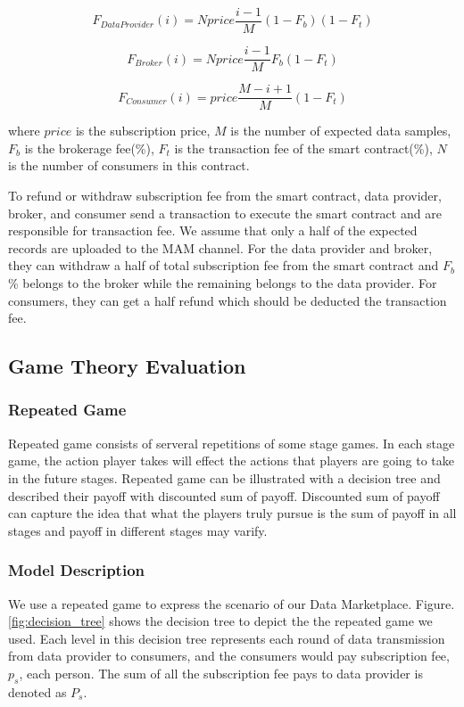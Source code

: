 \documentclass[journal,a4paper]{IEEEtran}
\begin{document}
\begin{equation}
F_{DataProvider}(i) = N price \frac{i-1}{M} (1-F_{b}) (1-F_{t})
\end{equation}

\begin{equation}
F_{Broker}(i) = N price \frac{i-1}{M} F_{b} (1-F_{t})
\end{equation}

\begin{equation}
F_{Consumer}(i) = price \frac{M-i+1}{M} (1-F_{t})
\end{equation}

where $price$  is the subscription price, $M$ is the number of expected data samples, $F_{b}$ is the brokerage fee(\%), $F_{t}$ is the transaction fee of the smart contract(\%), $N$ is the number of consumers in this contract.

To refund or withdraw subscription fee from the smart contract, data provider, broker, and consumer send a transaction to execute the smart contract and are responsible for transaction fee. We assume that only a half of the expected records are uploaded to the MAM channel. For the data provider and broker, they can withdraw a half of total subscription fee from the smart contract and $F_{b}$ \% belongs to the broker while the remaining belongs to the data provider. For consumers, they can get a half refund which should be deducted the transaction fee.



\subsection{Game Theory Evaluation}
\subsubsection{Repeated Game}
Repeated game consists of serveral repetitions of some stage games. In each stage game, the action player takes will effect the actions that players are going to take in the future stages. Repeated game can be illustrated with a decision tree and described their payoff with discounted sum of payoff. Discounted sum of payoff can capture the idea that what the players truly pursue is the sum of payoff in all stages and payoff in different stages may varify.

\subsubsection{Model Description}
We use a repeated game to express the scenario of our Data Marketplace. Figure.\ref{fig:decision_tree} shows the decision tree to depict the the repeated game we used. Each level in this decision tree represents each round of data transmission from data provider to consumers, and the consumers would pay subscription fee, $p_s$, each person. The sum of all the subscription fee pays to data provider is denoted as $P_s$.
\end{document}
